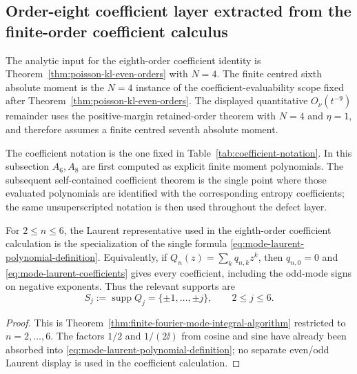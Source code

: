 
\ifdefined\JFAArticleDefectLadder
\else

\subsection{Order-eight coefficient layer extracted from the finite-order coefficient calculus}%
\label{subsec:order-eight-coefficient-layer}
\label{subsec:eighth-order-defects}

The analytic input for the eighth-order coefficient identity is
Theorem~\ref{thm:poisson-kl-even-orders} with \(N=4\).  The finite centred
sixth absolute moment is the \(N=4\) instance of the coefficient-evaluability
scope fixed after Theorem~\ref{thm:poisson-kl-even-orders}.  The displayed
quantitative \(O_\nu(t^{-9})\) remainder uses
the positive-margin retained-order theorem with \(N=4\) and \(\eta=1\),
and therefore assumes a finite centred seventh absolute moment.

The coefficient notation is the one fixed in
Table~\ref{tab:coefficient-notation}.  In this subsection \(A_6,A_8\) are
first computed as explicit finite moment polynomials.  The subsequent
self-contained coefficient theorem is the single point where those evaluated
polynomials are identified with the corresponding entropy coefficients; the
same unsuperscripted notation is then used throughout the defect layer.

\begin{lemma}%
\label{lem:n4-uniform-laurent-representatives}
For \(2\le n\le6\), the Laurent representative used in the eighth-order
coefficient calculation is the specialization of the single formula
\eqref{eq:mode-laurent-polynomial-definition}.  Equivalently, if
\(Q_n(z)=\sum_kq_{n,k}z^k\), then \(q_{n,0}=0\) and
\eqref{eq:mode-laurent-coefficients} gives every coefficient, including the
odd-mode signs on negative exponents.  Thus the relevant supports are
\[
S_j:=\operatorname{supp} Q_j=\{\pm1,\ldots,\pm j\},
\qquad 2\le j\le6.
\]
\end{lemma}

\begin{proof}
This is Theorem~\ref{thm:finite-fourier-mode-integral-algorithm} restricted
to \(n=2,\ldots,6\).  The factors \(1/2\) and \(1/(2\ii)\) from cosine and
sine have already been absorbed into
\eqref{eq:mode-laurent-polynomial-definition}; no separate even/odd Laurent
display is used in the coefficient calculation.
\end{proof}

